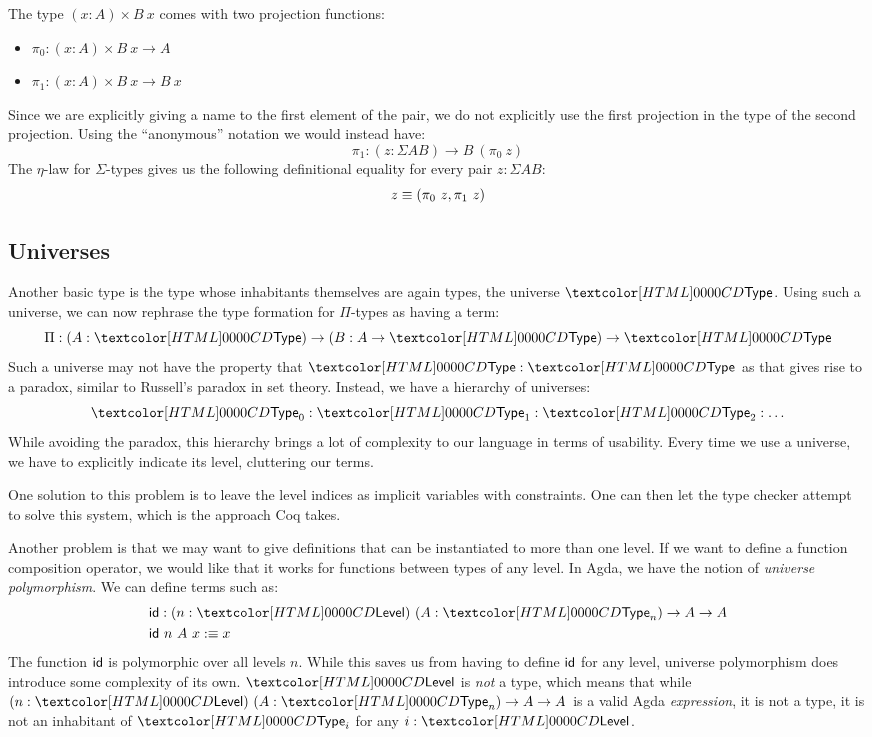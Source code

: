 The type $(x : A) \times B\ x$ comes with two projection functions:
\begin{itemize}
\item $\pi_0 : (x : A) \times B\ x \to A$
\item $\pi_1 : (x : A) \times B\ x \to B\ x$
\end{itemize}
Since we are explicitly giving a name to the first element of the
pair, we do not explicitly use the first projection in the type of the
second projection. Using the ``anonymous'' notation we would instead have:
$$
\pi_1 : (z : \Sigma A B) \to B\ (\pi_0\ z)
$$
The $\eta$-law for $\Sigma$-types gives us the following definitional
equality for every pair $z : \Sigma A B$:
$$
z \equiv (\pi_0\ z , \pi_1\ z)
$$

\subsection{Universes}

Another basic type is the type whose inhabitants themselves are again
types, the universe $\Type$. Using such a universe, we can now
rephrase the type formation for $\Pi$-types as having a term:
$$
\Pi : (A : \Type) \to (B : A \to \Type) \to \Type
$$
Such a universe may not have the property that $\Type : \Type$ as that
gives rise to a paradox, similar to Russell's paradox in set
theory. Instead, we have a hierarchy of universes:
$$
\Type_0 : \Type_1 : \Type_2 : \hdots
$$
While avoiding the paradox, this hierarchy brings a lot of complexity
to our language in terms of usability. Every time we use a universe,
we have to explicitly indicate its level, cluttering our terms.

One solution to this problem is to leave the level indices as implicit
variables with constraints. One can then let the type checker attempt
to solve this system, which is the approach Coq takes. 

Another problem is that we may want to give definitions that can be
instantiated to more than one level. If we want to define a function
composition operator, we would like that it works for functions
between types of any level. In Agda, we have the notion of
\emph{universe polymorphism}. We can define terms such as:
\begin{align*}
  &\id : (n : \Level)\ (A : \Type_n) \to A \to A \\
  &\id\ n\ A\ x \ddefeq x
\end{align*}
The function $\id$ is polymorphic over all levels $n$. While this
saves us from having to define $\id$ for any level, universe
polymorphism does introduce some complexity of its own. $\Level$ is
\emph{not} a type, which means that while
$(n : \Level)\ (A : \Type_n) \to A \to A$ is a valid Agda
\emph{expression}, it is not a type, \ie it is not an inhabitant of
$\Type_i$ for any $i : \Level$.


